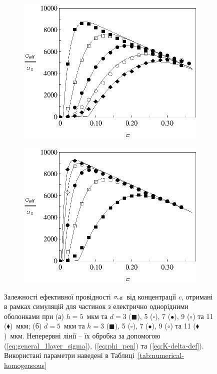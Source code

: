 \documentclass[14pt,twoside]{vakthesis}
\begin{document}
\begin{figure}[tb]
	\centering
	\begin{subfigure}[c]{0.48\textwidth}
		\includegraphics[width=\textwidth]{Fig6_Siekierski_HomogeneousLayers_t_fixed.eps}
		\caption{} \label{fig:simulations-sigma-1layer2005-a}
	\end{subfigure}
	\quad
	\begin{subfigure}[c]{0.48\textwidth}
		\includegraphics[width=\textwidth]{Fig7_Siekierski_HomogeneousLayers_d_fixed.eps}
		\caption{} \label{fig:simulations-sigma-1layer2005-b}
	\end{subfigure}
	\caption{\label{fig:simulations-sigma-1layer2005}
		Залежності ефективної провідності $\sigma_{\rm eff}$ від концентрації $c$, отримані в рамках симуляцій \cite{Siekierski2005} для частинок з електрично однорідними оболонками при (а) $h = 5$~мкм та $d = 3$ ($\blacksquare$), 5 ($\square$), 7 ($\bullet$), 9 ($\circ$) та 11 ($\blacklozenge$)~мкм; (б) $d = 5$~мкм та $h = 3$ ($\blacksquare$), 5 ($\square$), 7 ($\bullet$), 9 ($\circ$) та 11 ($\blacklozenge$)~мкм. 
		Неперервні лінії -- їх обробка за допомогою (\ref{eq:general_1layer_sigma}), (\ref{eq:phi_pen}) та (\ref{eq:K-delta-def}). 
		Використані параметри наведені в Таблиці~\ref{tab:numerical-homogeneous}}
\end{figure}
\end{document}

